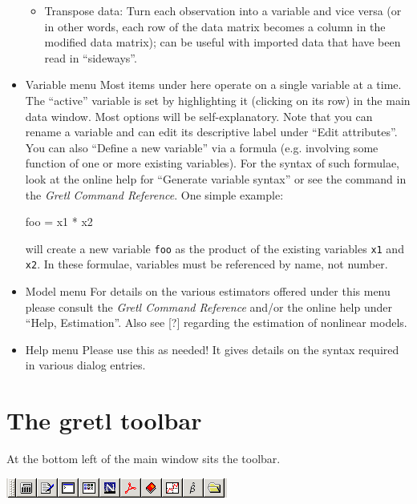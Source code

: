 \begin{itemize}
\begin{itemize}
  \item \textsf{Transpose data}: Turn each observation into a variable
    and vice versa (or in other words, each row of the data matrix
    becomes a column in the modified data matrix); can be useful with
    imported data that have been read in ``sideways''.
	    
  \end{itemize}


\item \textsf{Variable menu} Most items under here operate on a single
  variable at a time.  The ``active'' variable is set by highlighting
  it (clicking on its row) in the main data window.  Most options will
  be self-explanatory.  Note that you can rename a variable and can
  edit its descriptive label under ``Edit attributes''. You can also
  ``Define a new variable'' via a formula (e.g. involving some
  function of one or more existing variables). For the syntax of such
  formulae, look at the online help for ``Generate variable syntax''
  or see the  command in the \emph{Gretl Command Reference}.
  One simple example:
	  
\begin{code} 
	    foo = x1 * x2
\end{code}

  will create a new variable \verb+foo+ as the product of the existing
  variables \verb+x1+ and \verb+x2+.  In these formulae, variables
  must be referenced by name, not number.
\item \textsf{Model menu} For details on the various estimators
  offered under this menu please consult the \emph{Gretl Command
    Reference} and/or the online help under ``Help, Estimation''.
  Also see [?] regarding the estimation of nonlinear models.
\item \textsf{Help menu} Please use this as needed! It gives details
  on the syntax required in various dialog entries.
\end{itemize}



\section{The gretl toolbar}
\label{toolbar}

At the bottom left of the main window sits the
      toolbar.

\begin{center}
  \includegraphics[scale=0.5]{figures/toolbar}
\end{center}

